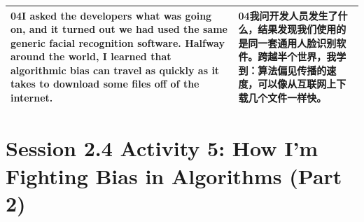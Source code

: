 \documentclass[UTF8,zihao=-4,fontset=fandol]{ctexart}
\newcommand{\TranscriptColumn}{\raggedright\arraybackslash\hyphenpenalty=10000\exhyphenpenalty=10000\sloppy}
\begin{document}
\begin{longtable}{>{\TranscriptColumn}p{} >{\TranscriptColumn}p{}}
\textbf{04}\quad I asked the developers what was going on, and it turned out we had used the same generic facial recognition software. Halfway around the world, I learned that algorithmic bias can travel as quickly as it takes to download some files off of the internet. & \textbf{04}\quad 我问开发人员发生了什么，结果发现我们使用的是同一套通用人脸识别软件。跨越半个世界，我学到：算法偏见传播的速度，可以像从互联网上下载几个文件一样快。 \\ \hline
\end{longtable}


\clearpage
\section{Session 2.4 Activity 5: How I'm Fighting Bias in Algorithms (Part 2)}
\end{document}
